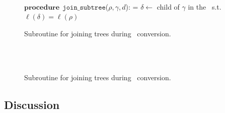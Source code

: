 \ifdefined\noauthorea
\begin{figure}[ht!]
\IncMargin{2em}
\begin{algorithm}[H]
\DontPrintSemicolon
\LinesNumbered
\SetAlgoNoLine
\SetNlSkip{1em} 
\Indm\Indmm
\hrulefill\\
$\mathbf{procedure} \> \> \texttt{join\_subtree}$($\rho,\gamma,d$):\;
\vspace{1mm}
\everypar={\nl}
\Indp\Indpp
$\delta\gets$ child of $\gamma$ in the \kipf\ s.t. $\ell(\delta)=\ell(\rho)$\;
\vspace{-2mm}
\Indm\Indmm
\nonl\hrulefill\vspace{1mm}\\
\DecMargin{1.0em}
\caption{\label{alg:kblpp-join-subtrees} Subroutine for joining trees during \ksf\ conversion.}
\DecMargin{1.0em}
\end{algorithm}
\end{figure}

\else
\begin{figure}[ht]
\caption{\label{alg:kblpp-join-subtrees} Subroutine for joining trees during \ksf\ conversion.}
\begin{small}
\begin{minipage}{0.9\textwidth}
\hrulefill\\
\algmissing\

\vspace{-1mm}
\hrulefill
\vspace{-2mm}
\end{minipage}
\end{small}
\end{figure}
\fi


\subsection{Discussion}

\missing


